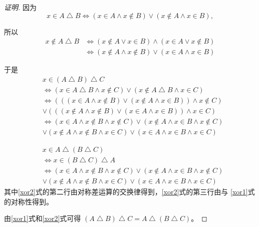 \begin{proof}[证明]

  
  因为
  \begin{equation}
  x \in A \bigtriangleup B \Leftrightarrow
  (x \in A \land x \notin B) \lor (x \notin A \land x
  \in B),    
  \end{equation}

  所以
  \begin{equation}
    \begin{split}
      x \notin A \bigtriangleup B &\Leftrightarrow
  (x \notin A \lor x \in B) \land (x \in A \lor x
  \notin B)\\
  &\Leftrightarrow (x \notin A \land x \notin B) \lor (x \in A \land x \in B )
    \end{split}
  \end{equation}

  于是
  \begin{equation}\label{xor1}
    \begin{split}
      &x \in (A \bigtriangleup B) \bigtriangleup C\\
      &\Leftrightarrow (x \in A \bigtriangleup B \land x \notin C) \lor (x \notin A \bigtriangleup B \land x \in C)\\
      &\Leftrightarrow (((x \in A \land x \notin B) \lor (x \notin A \land x \in B)) \land x \notin C)\\
      &\lor (((x \notin A \land x \notin B) \lor (x \in A \land x \in B )) \land x \in C)\\
      &\Leftrightarrow (x \in A \land x \notin B \land x \notin C) \lor (x \notin A \land x \in B \land x \notin C)\\
      &\lor (x \notin A \land x \notin B \land x \in C) \lor (x \in A \land x \in B \land x \in C)
    \end{split}
  \end{equation}

  \begin{equation}\label{xor2}
    \begin{split}
      &x \in A \bigtriangleup (B \bigtriangleup C)\\
      &\Leftrightarrow x \in (B \bigtriangleup C) \bigtriangleup A\\
      &\Leftrightarrow (x \in A \land x \notin B \land x \notin C) \lor (x \notin A \land x \in B \land x \notin C)\\
      &\lor (x \notin A \land x \notin B \land x \in C) \lor (x \in A \land x \in B \land x \in C)
    \end{split}
  \end{equation}
  其中\eqref{xor2}式的第二行由对称差运算的交换律得到，\eqref{xor2}式的第三行由与
   \eqref{xor1}式的对称性得到。

  由\eqref{xor1}式和\eqref{xor2}式可得
  $(A\bigtriangleup B)\bigtriangleup C = A\bigtriangleup (B\bigtriangleup C)$。
\end{proof}

